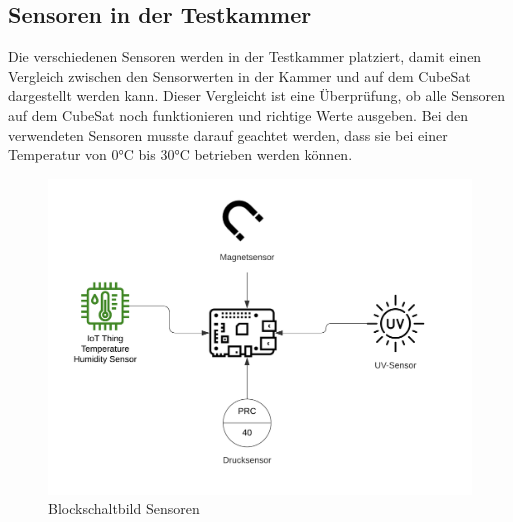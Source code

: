 \subsection{Sensoren in der Testkammer}\label{sec:Sensoren in der Testkammer}
Die verschiedenen Sensoren werden in der Testkammer platziert, damit einen Vergleich zwischen den Sensorwerten in der Kammer und auf dem CubeSat dargestellt werden kann. Dieser Vergleicht ist eine Überprüfung, ob alle Sensoren auf dem CubeSat noch funktionieren und richtige Werte ausgeben. Bei den verwendeten Sensoren musste darauf geachtet werden, dass sie bei einer Temperatur von 0°C bis 30°C betrieben werden können.
\begin{figure}[H]
	\centering
	\includegraphics[scale=0.3]{image/blocksensor.png}
	\caption{Blockschaltbild Sensoren}
\end{figure}

\newpage



